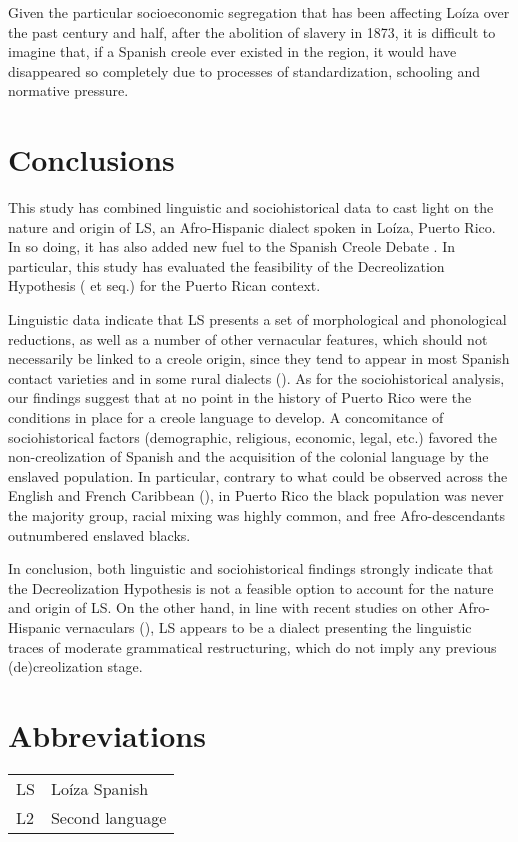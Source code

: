 \documentclass[output=paper,colorlinks,citecolor=brown]{langscibook}
\begin{document}
Given the particular socioeconomic segregation that has been affecting Loíza over the past century and half, after the abolition of slavery in 1873, it is difficult to imagine that, if a Spanish creole ever existed in the region, it would have disappeared so completely due to processes of standardization, schooling and normative pressure.

\section{Conclusions}
 
This study has combined linguistic and sociohistorical data to cast light on the nature and origin of LS, an Afro-Hispanic dialect spoken in Loíza, Puerto Rico. In so doing, it has also added new fuel to the Spanish Creole Debate \citep{Lipski2005}. In particular, this study has evaluated the feasibility of the Decreolization Hypothesis (\citealt{Grandade1968} et seq.) for the Puerto Rican context. 

Linguistic data indicate that LS presents a set of morphological and phonological reductions, as well as a number of other vernacular features, which should not necessarily be linked to a creole origin, since they tend to appear in most Spanish contact varieties and in some rural dialects (\citealt{Klee_lynch2009,Zamora-Vicente1989,lipski1994latin}). As for the sociohistorical analysis, our findings suggest that at no point in the history of Puerto Rico were the conditions in place for a creole language to develop. A concomitance of sociohistorical factors (demographic, religious, economic, legal, etc.) favored the non-creolization of Spanish and the acquisition of the colonial language by the enslaved population. In particular, contrary to what could be observed across the English and French Caribbean (\citealt{Mintz1971,laurence1974caribbean,Clements2009}), in Puerto Rico the black population was never the majority group, racial mixing was highly common, and free Afro-descendants outnumbered enslaved blacks.
 
In conclusion, both linguistic and sociohistorical findings strongly indicate that the Decreolization Hypothesis is not a feasible option to account for the nature and origin of LS. On the other hand, in line with recent studies on other Afro-Hispanic vernaculars (\citealt{Díaz-Campos_clements2008,Sessarego2014, Sessarego2019}), LS appears to be a dialect presenting the linguistic traces of moderate grammatical restructuring, which do not imply any previous (de)creolization stage.

\section*{Abbreviations}
\begin{tabular}{@{}ll@{}}
{LS} & Loíza Spanish\\
{L2} & Second language\\
\end{tabular}

\printbibliography[heading=subbibliography,notkeyword=this]
\end{document}
